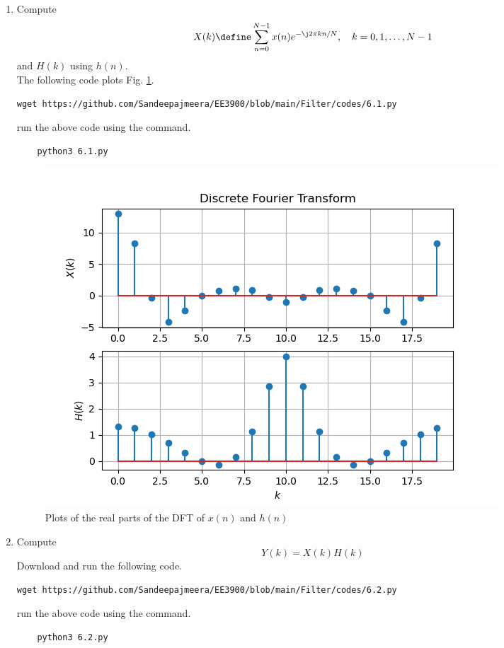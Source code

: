 \documentclass[journal,12pt,twocolumn]{IEEEtran}
\renewcommand\thesection{\arabic{section}}
\begin{document}
\begin{enumerate}[label=\thesection.\arabic*
,ref=\thesection.\theenumi]
\item
Compute
\begin{equation}
X(k) \define \sum _{n=0}^{N-1}x(n) e^{-\j2\pi kn/N}, \quad k = 0,1,\dots, N-1
\end{equation}
and $H(k)$ using $h(n)$.\\
\solution The following code plots Fig. \ref{fig:6.1}.
%
\begin{lstlisting}
wget https://github.com/Sandeepajmeera/EE3900/blob/main/Filter/codes/6.1.py
\end{lstlisting}
run the above code using the command.
\begin{lstlisting}
	python3 6.1.py
\end{lstlisting}
\begin{figure}[!ht]
\centering
\includegraphics[width=\columnwidth]{./figs/6.1.png}
\caption{Plots of the real parts of the DFT of $x(n)$ and $h(n)$}
\label{fig:6.1}
\end{figure}

\item Compute 
\begin{equation}\label{6.2}
Y(k) = X(k)H(k)
\end{equation}
\solution Download and run the following code.
%
\begin{lstlisting}
wget https://github.com/Sandeepajmeera/EE3900/blob/main/Filter/codes/6.2.py
\end{lstlisting}
run the above code using the command.
\begin{lstlisting}
	python3 6.2.py
\end{lstlisting}


\end{enumerate}
\end{document}

